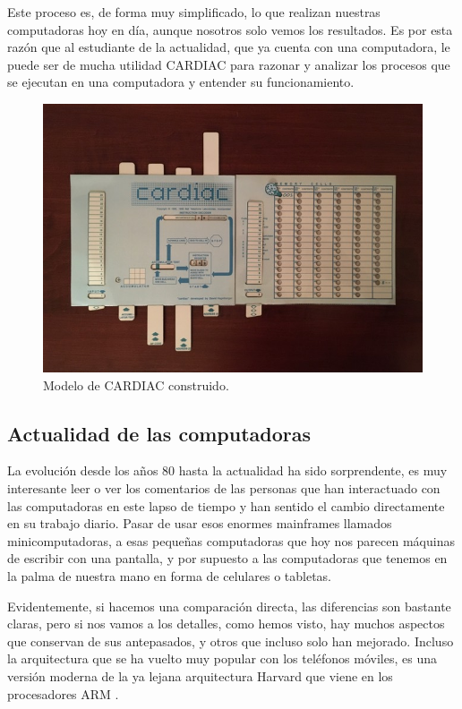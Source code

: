 \documentclass[letterpaper,12pt,oneside]{book}
\begin{document}
		

  
        Este proceso es, de forma muy simplificado,
		lo que realizan nuestras computadoras hoy en día, aunque nosotros solo vemos los resultados. Es por esta 
		razón que al estudiante de la actualidad, que ya cuenta con una computadora, le puede ser de mucha utilidad
		CARDIAC para razonar y analizar los procesos que se ejecutan en una computadora y entender su funcionamiento.

		\begin{figure}[h]
		\centering
			\includegraphics[scale=0.75]{media/CARDIAC_Paper/Construida.jpg}
			\caption{Modelo de CARDIAC construido.}
			\label{fig:CARDIAC_Construida}
		\end{figure}

		\clearpage		

	
		\subsection{Actualidad de las computadoras}
		
		
		La evolución desde los años 80 hasta la actualidad ha sido sorprendente, es muy interesante leer o ver los comentarios de las personas que han interactuado
		con las computadoras en este lapso de tiempo y han sentido el cambio directamente en su trabajo diario. Pasar de usar esos enormes mainframes
		llamados minicomputadoras, a esas pequeñas computadoras que hoy nos parecen  máquinas de escribir con una pantalla, y por supuesto a las 
		computadoras que tenemos en la palma de nuestra mano en forma de celulares o tabletas.
  
  
        Evidentemente, si hacemos una comparación directa, las diferencias
		son bastante claras, pero si nos vamos a los detalles, como hemos visto, hay muchos aspectos que conservan de sus antepasados, y otros que incluso solo
		han mejorado. Incluso la arquitectura  que se ha vuelto muy popular con los teléfonos móviles, es una versión moderna de la ya lejana
		arquitectura Harvard que viene en los procesadores ARM \cite[p. 109]{valvano_introduction_2017}.
  
\end{document}
